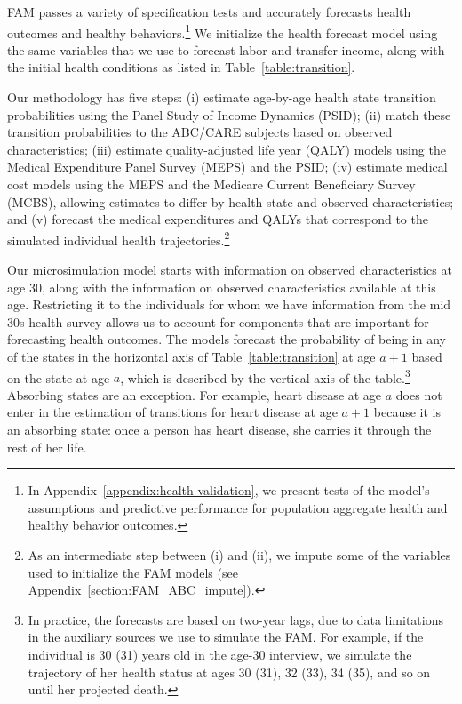 FAM passes a variety of specification tests and accurately forecasts health outcomes and healthy behaviors.\footnote{In Appendix~\ref{appendix:health-validation}, we present tests of the model's assumptions and predictive performance for population aggregate health and healthy behavior outcomes.} We initialize the health forecast model using the same variables that we use to forecast labor and transfer income, along with the initial health conditions as listed in Table~\ref{table:transition}.

Our methodology has five steps: (i) estimate age-by-age health state transition probabilities using the Panel Study of Income Dynamics (PSID); (ii) match these transition probabilities to the ABC/CARE subjects based on observed characteristics; (iii) estimate quality-adjusted life year (QALY) models using the Medical Expenditure Panel Survey (MEPS) and the PSID; (iv) estimate medical cost models using the MEPS and the Medicare Current Beneficiary Survey (MCBS), allowing estimates to differ by health state and observed characteristics; and (v) forecast the medical expenditures and QALYs that correspond to the simulated individual health trajectories.\footnote{As an intermediate step between (i) and (ii), we impute some of the variables used to initialize the FAM models (see  Appendix~\ref{section:FAM_ABC_impute}).}

Our microsimulation model starts with information on observed characteristics at age 30, along with the information on observed characteristics available at this age. Restricting it to the individuals for whom we have information from the mid 30s health survey allows us to account for components that are important for forecasting health outcomes. The models forecast the probability of being in any of the states in the horizontal axis of Table~\ref{table:transition} at age $a+1$ based on the state at age $a$, which is described by the vertical axis of the table.\footnote{In practice, the forecasts are based on two-year lags, due to data limitations in the auxiliary sources we use to simulate the FAM. For example, if the individual is 30 (31) years old in the age-30 interview, we simulate the trajectory of her health status at ages 30 (31), 32 (33), 34 (35), and so on until her projected death.} Absorbing states are an exception. For example, heart disease at age $a$ does not enter in the estimation of transitions for heart disease at age $a+1$ because it is an absorbing state: once a person has heart disease, she carries it through the rest of her life.

